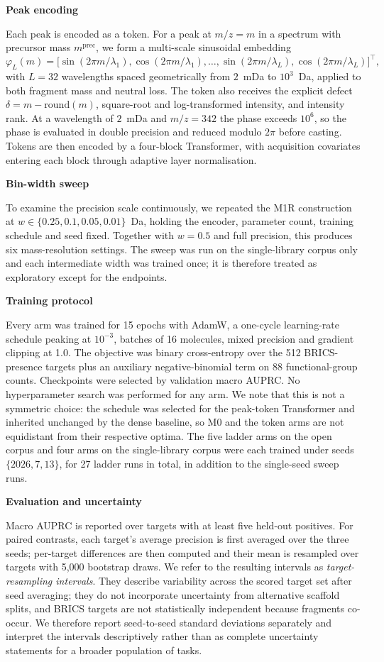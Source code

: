 \documentclass[11pt]{article}
\newcommand{\hd}[1]{\medskip\par\noindent\textbf{#1}\par\nobreak\vspace{2pt}\noindent\ignorespaces}
\newcommand{\mz}{\ensuremath{m/z}}
\begin{document}
\hd{Peak encoding}
Each peak is encoded as a token. For a peak at $\mz=m$ in a spectrum with precursor mass $m^{\mathrm{prec}}$, we form a multi-scale sinusoidal embedding
\begin{equation}
\varphi_L(m)=\bigl[\sin(2\pi m/\lambda_1),\cos(2\pi m/\lambda_1),\ldots,\sin(2\pi m/\lambda_L),\cos(2\pi m/\lambda_L)\bigr]^\top,
\end{equation}
with $L=32$ wavelengths spaced geometrically from $2$~mDa to $10^3$~Da, applied to both fragment mass and neutral loss. The token also receives the explicit defect $\delta=m-\mathrm{round}(m)$, square-root and log-transformed intensity, and intensity rank. At a wavelength of $2$~mDa and $\mz=342$ the phase exceeds $10^6$, so the phase is evaluated in double precision and reduced modulo $2\pi$ before casting. Tokens are then encoded by a four-block Transformer, with acquisition covariates entering each block through adaptive layer normalisation.

\hd{Bin-width sweep}
To examine the precision scale continuously, we repeated the M1R construction at $w\in\{0.25,0.1,0.05,0.01\}$~Da, holding the encoder, parameter count, training schedule and seed fixed. Together with $w=0.5$ and full precision, this produces six mass-resolution settings. The sweep was run on the single-library corpus only and each intermediate width was trained once; it is therefore treated as exploratory except for the endpoints.

\hd{Training protocol}
Every arm was trained for 15 epochs with AdamW, a one-cycle learning-rate schedule peaking at $10^{-3}$, batches of 16 molecules, mixed precision and gradient clipping at 1.0. The objective was binary cross-entropy over the 512 BRICS-presence targets plus an auxiliary negative-binomial term on 88 functional-group counts. Checkpoints were selected by validation macro AUPRC. No hyperparameter search was performed for any arm. We note that this is not a symmetric choice: the schedule was selected for the peak-token Transformer and inherited unchanged by the dense baseline, so M0 and the token arms are not equidistant from their respective optima. The five ladder arms on the open corpus and four arms on the single-library corpus were each trained under seeds $\{2026,7,13\}$, for 27 ladder runs in total, in addition to the single-seed sweep runs.

\hd{Evaluation and uncertainty}
Macro AUPRC is reported over targets with at least five held-out positives. For paired contrasts, each target's average precision is first averaged over the three seeds; per-target differences are then computed and their mean is resampled over targets with 5,000 bootstrap draws. We refer to the resulting intervals as \emph{target-resampling intervals}. They describe variability across the scored target set after seed averaging; they do not incorporate uncertainty from alternative scaffold splits, and BRICS targets are not statistically independent because fragments co-occur. We therefore report seed-to-seed standard deviations separately and interpret the intervals descriptively rather than as complete uncertainty statements for a broader population of tasks.
\end{document}

